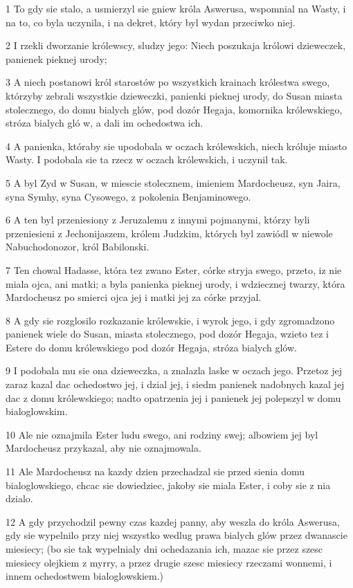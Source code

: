 \par 1 To gdy sie stalo, a usmierzyl sie gniew króla Aswerusa, wspomnial na Wasty, i na to, co byla uczynila, i na dekret, który byl wydan przeciwko niej.
\par 2 I rzekli dworzanie królewscy, sludzy jego: Niech poszukaja królowi dzieweczek, panienek pieknej urody;
\par 3 A niech postanowi król starostów po wszystkich krainach królestwa swego, którzyby zebrali wszystkie dzieweczki, panienki pieknej urody, do Susan miasta stolecznego, do domu bialych glów, pod dozór Hegaja, komornika królewskiego, stróza bialych gló w, a dali im ochedostwa ich.
\par 4 A panienka, któraby sie upodobala w oczach królewskich, niech króluje miasto Wasty. I podobala sie ta rzecz w oczach królewskich, i uczynil tak.
\par 5 A byl Zyd w Susan, w miescie stolecznem, imieniem Mardocheusz, syn Jaira, syna Symhy, syna Cysowego, z pokolenia Benjaminowego.
\par 6 A ten byl przeniesiony z Jeruzalemu z innymi pojmanymi, którzy byli przeniesieni z Jechonijaszem, królem Judzkim, których byl zawiódl w niewole Nabuchodonozor, król Babilonski.
\par 7 Ten chowal Hadasse, która tez zwano Ester, córke stryja swego, przeto, iz nie miala ojca, ani matki; a byla panienka pieknej urody, i wdziecznej twarzy, która Mardocheusz po smierci ojca jej i matki jej za córke przyjal.
\par 8 A gdy sie rozglosilo rozkazanie królewskie, i wyrok jego, i gdy zgromadzono panienek wiele do Susan, miasta stolecznego, pod dozór Hegaja, wzieto tez i Estere do domu królewskiego pod dozór Hegaja, stróza bialych glów.
\par 9 I podobala mu sie ona dzieweczka, a znalazla laske w oczach jego. Przetoz jej zaraz kazal dac ochedostwo jej, i dzial jej, i siedm panienek nadobnych kazal jej dac z domu królewskiego; nadto opatrzenia jej i panienek jej polepszyl w domu bialoglowskim.
\par 10 Ale nie oznajmila Ester ludu swego, ani rodziny swej; albowiem jej byl Mardocheusz przykazal, aby nie oznajmowala.
\par 11 Ale Mardocheusz na kazdy dzien przechadzal sie przed sienia domu bialoglowskiego, chcac sie dowiedziec, jakoby sie miala Ester, i coby sie z nia dzialo.
\par 12 A gdy przychodzil pewny czas kazdej panny, aby weszla do króla Aswerusa, gdy sie wypelnilo przy niej wszystko wedlug prawa bialych glów przez dwanascie miesiecy; (bo sie tak wypelnialy dni ochedazania ich, mazac sie przez szesc miesiecy olejkiem z myrry, a przez drugie szesc miesiecy rzeczami wonnemi, i innem ochedostwem bialoglowskiem.)
